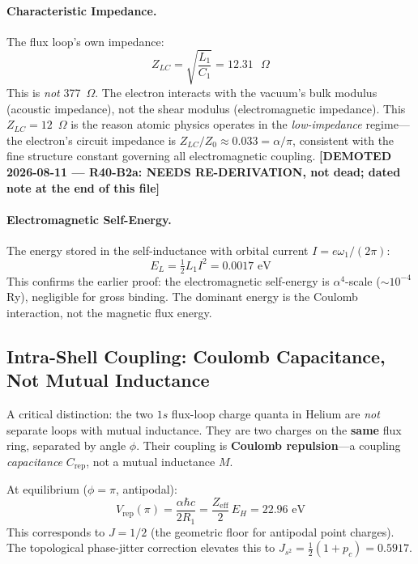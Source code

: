 \paragraph{Characteristic Impedance.} The flux loop's own impedance:
\begin{equation}
    Z_{LC} = \sqrt{\frac{L_1}{C_1}} = 12.31 \text{ $\Omega$}
\end{equation}
This is \emph{not} 377~$\Omega$. The electron interacts with the vacuum's bulk modulus (acoustic impedance), not the shear modulus (electromagnetic impedance). This $Z_{LC} = 12$~$\Omega$ is the reason atomic physics operates in the \emph{low-impedance} regime---the electron's circuit impedance is $Z_{LC}/Z_0 \approx 0.033 = \alpha/\pi$, consistent with the fine structure constant governing all electromagnetic coupling. \textbf{[DEMOTED 2026-08-11 --- R40-B2a: NEEDS RE-DERIVATION, not dead; dated note at the end of this file]}

\paragraph{Electromagnetic Self-Energy.} The energy stored in the self-inductance with orbital current $I = e\omega_1/(2\pi)$:
\begin{equation}
    E_L = \tfrac{1}{2}L_1 I^2 = 0.0017 \text{ eV}
\end{equation}
This confirms the earlier proof: the electromagnetic self-energy is $\alpha^4$-scale ($\sim 10^{-4}$ Ry), negligible for gross binding. The dominant energy is the Coulomb interaction, not the magnetic flux energy.

\subsection{Intra-Shell Coupling: Coulomb Capacitance, Not Mutual Inductance}

A critical distinction: the two $1s$ flux-loop charge quanta in Helium are \emph{not} separate loops with mutual inductance. They are two charges on the \textbf{same} flux ring, separated by angle $\phi$. Their coupling is \textbf{Coulomb repulsion}---a coupling \emph{capacitance} $C_\text{rep}$, not a mutual inductance $M$.

At equilibrium ($\phi = \pi$, antipodal):
\begin{equation}
    V_\text{rep}(\pi) = \frac{\alpha \hbar c}{2R_1} = \frac{Z_\text{eff}}{2}\,E_H = 22.96 \text{ eV}
\end{equation}
This corresponds to $J = 1/2$ (the geometric floor for antipodal point charges). The topological phase-jitter correction elevates this to $J_{s^2} = \frac{1}{2}(1 + p_c) = 0.5917$.

